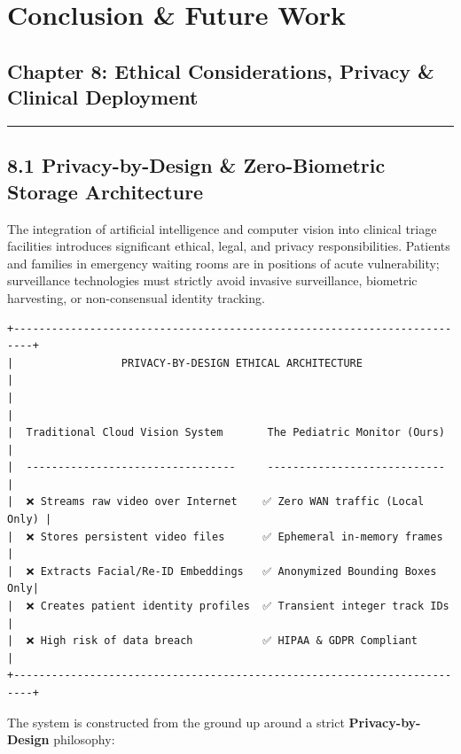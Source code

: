 \chapter{Conclusion \& Future Work}\label{conclusion-future-work}

\section{Chapter 8: Ethical Considerations, Privacy \& Clinical
Deployment}\label{chapter-8-ethical-considerations-privacy-clinical-deployment}

\begin{center}\rule{0.5\linewidth}{0.5pt}\end{center}

\section{8.1 Privacy-by-Design \& Zero-Biometric Storage
Architecture}\label{privacy-by-design-zero-biometric-storage-architecture}

The integration of artificial intelligence and computer vision into
clinical triage facilities introduces significant ethical, legal, and
privacy responsibilities. Patients and families in emergency waiting
rooms are in positions of acute vulnerability; surveillance technologies
must strictly avoid invasive surveillance, biometric harvesting, or
non-consensual identity tracking.

\begin{verbatim}
+-------------------------------------------------------------------------+
|                 PRIVACY-BY-DESIGN ETHICAL ARCHITECTURE                  |
|                                                                         |
|  Traditional Cloud Vision System       The Pediatric Monitor (Ours)     |
|  ---------------------------------     ----------------------------     |
|  ❌ Streams raw video over Internet    ✅ Zero WAN traffic (Local Only) |
|  ❌ Stores persistent video files      ✅ Ephemeral in-memory frames    |
|  ❌ Extracts Facial/Re-ID Embeddings   ✅ Anonymized Bounding Boxes Only|
|  ❌ Creates patient identity profiles  ✅ Transient integer track IDs   |
|  ❌ High risk of data breach           ✅ HIPAA & GDPR Compliant        |
+-------------------------------------------------------------------------+
\end{verbatim}

The system is constructed from the ground up around a strict
\textbf{Privacy-by-Design} philosophy:

